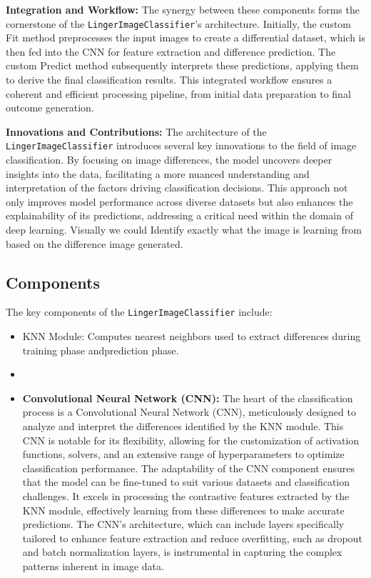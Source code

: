 \documentclass[a4paper, 12pt]{report}
\begin{document}
\textbf{Integration and Workflow:}
The synergy between these components forms the cornerstone of the \texttt{LingerImageClassifier}'s architecture. Initially, the custom Fit method preprocesses the input images to create a differential dataset, which is then fed into the CNN for feature extraction and difference prediction. The custom Predict method subsequently interprets these predictions, applying them to derive the final classification results. This integrated workflow ensures a coherent and efficient processing pipeline, from initial data preparation to final outcome generation.

\textbf{Innovations and Contributions:}
The architecture of the \texttt{LingerImageClassifier} introduces several key innovations to the field of image classification. 
By focusing on image differences, the model uncovers deeper insights into the data, facilitating a more nuanced understanding and interpretation 
of the factors driving classification decisions. This approach not only improves model performance across diverse datasets but also enhances the 
explainability of its predictions, addressing a critical need within the domain of deep learning. 
Visually we could Identify exactly what the image is learning from based on the difference image generated.

\subsection{Components}
The key components of the \texttt{LingerImageClassifier} include:
\begin{itemize}
\item KNN Module: Computes nearest neighbors used to extract differences during training phase andprediction phase.
\item 
\item \textbf{Convolutional Neural Network (CNN):} The heart of the classification process is a Convolutional Neural Network (CNN), 
    meticulously designed to analyze and interpret the differences identified by the KNN module. This CNN is notable for its flexibility, 
    allowing for the customization of activation functions, solvers, and an extensive range of hyperparameters to optimize classification performance. 
    The adaptability of the CNN component ensures that the model can be fine-tuned to suit various datasets and classification challenges. 
    It excels in processing the contrastive features extracted by the KNN module, effectively learning from these differences to make accurate predictions. 
    The CNN's architecture, which can include layers specifically tailored to enhance feature extraction and reduce overfitting, such as dropout 
    and batch normalization layers, is instrumental in capturing the complex patterns inherent in image data.
\end{itemize}
\end{document}
